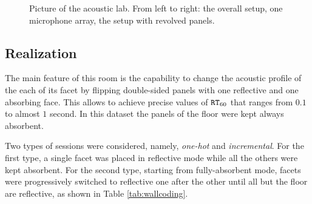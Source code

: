 \begin{figure}[h]
    \begin{fullwidth}
    \centering
    \label{fig:dechorate:seput}
    \caption{Picture of the acoustic lab. From left to right: the overall setup, one microphone array, the setup with revolved panels.}
    \end{fullwidth}
\end{figure}

\subsection{Realization}
The main feature of this room is the capability to change the acoustic profile of the each of its facet by flipping double-sided panels with one reflective and one absorbing face. This allows to achieve precise values of $\mathtt{RT}_{60}$ that ranges from $0.1$ to almost $1$ second. In this dataset the panels of the floor were kept always absorbent.

Two types of sessions were considered, namely, \textit{one-hot} and \textit{incremental}. For the first type, a single facet was placed in reflective mode while all the others were kept absorbent. For the second type, starting from fully-absorbent mode, facets were progressively switched to reflective one after the other until all but the floor are reflective, as shown in Table \ref{tab:wallcoding}.

